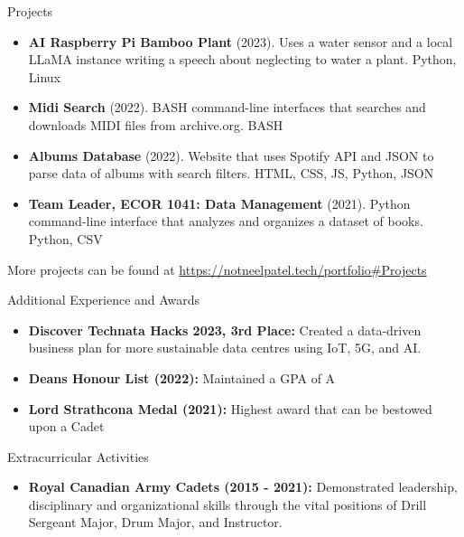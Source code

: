 \documentclass[]{mcdowellcv}
\begin{document}
	\begin{cvsection}{Projects}
		\begin{cvsubsection}{}{}{}
			\begin{itemize}
				\item \textbf{AI Raspberry Pi Bamboo Plant} (2023). Uses a water sensor and a local LLaMA instance writing a speech about neglecting to water a plant. Python, Linux
				\item \textbf{Midi Search} (2022). BASH command-line interfaces that searches and downloads MIDI files from archive.org. BASH
				\item \textbf{Albums Database} (2022). Website that uses Spotify API and JSON to parse data of albums with search filters. HTML, CSS, JS, Python, JSON
				\item \textbf{Team Leader, ECOR 1041: Data Management} (2021). Python command-line interface that analyzes and organizes a dataset of books. Python, CSV
			\end{itemize}
			
				More projects can be found at \url{https://notneelpatel.tech/portfolio#Projects}
		\end{cvsubsection}
	\end{cvsection}
	
	\begin{cvsection}{Additional Experience and Awards}
		\begin{cvsubsection}{}{}{}	
			\begin{itemize}
				\item \textbf{Discover Technata Hacks 2023, 3rd Place:} Created a data-driven business plan for more sustainable data centres using IoT, 5G, and AI.  
				\item \textbf {Deans Honour List (2022):} Maintained a GPA of A
				\item \textbf{Lord Strathcona Medal (2021):} Highest award that can be bestowed upon a Cadet
			\end{itemize}
		\end{cvsubsection}
	\end{cvsection}
	
	\begin{cvsection}{Extracurricular Activities}
		\begin{cvsubsection}{}{}{}
			\begin{itemize}
				\item \textbf{Royal Canadian Army Cadets (2015 - 2021):} Demonstrated leadership, disciplinary and organizational skills through the vital positions of Drill Sergeant Major, Drum Major, and Instructor.
			\end{itemize}
		\end{cvsubsection}
	\end{cvsection}
\end{document}
